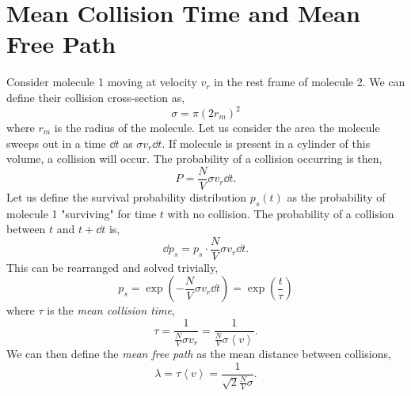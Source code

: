 \documentclass{book}
\begin{document}
\section{Mean Collision Time and Mean Free Path}
Consider molecule 1 moving at velocity $v_r$ in the rest frame of molecule 2. We can define their collision cross-section as,
\begin{equation}
	\sigma = \pi(2r_m)^2
\end{equation}
where $r_m$ is the radius of the molecule. Let us consider the area the molecule sweeps out in a time $\dd{t}$ as $\sigma v_r \dd{t}$. If molecule is present in a cylinder of this volume, a collision will occur. The probability of a collision occurring is then,
\begin{equation}
	P = \frac{N}{V}\sigma v_r \dd{t}.
\end{equation}
Let us define the survival probability distribution $p_s(t)$ as the probability of molecule 1 "surviving" for time $t$ with no collision. The probability of a collision between $t$ and $t + \dd{t}$ is,
\begin{equation}
	\dd{p_s} = p_s\cdot\frac{N}{V}\sigma v_r \dd{t}.
\end{equation}
This can be rearranged and solved trivially,
\begin{equation}
	\boxed{p_s = \exp\left(-\frac{N}{V}\sigma v_r \dd{t}\right) = \exp\left(\frac{t}{\tau}\right)}
\end{equation}
where $\tau$ is the \textit{mean collision time},
\begin{equation}
	\boxed{\tau = \frac{1}{\frac{N}{V}\sigma v_r} = \frac{1}{\frac{N}{V}\sigma\left<v\right>}}.
\end{equation}
We can then define the \textit{mean free path} as the mean distance between collisions,
\begin{equation}
	\boxed{\lambda = \tau \left<v\right> = \frac{1}{\sqrt{2}\frac{N}{V}\sigma}}. \label{eq:mean free path}
\end{equation}
\end{document}
